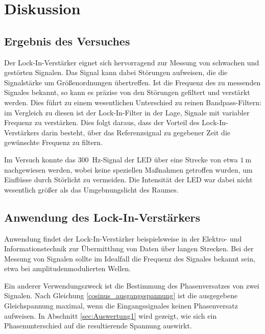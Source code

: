 \section{Diskussion}
\label{sec:Diskussion}

\subsection{Ergebnis des Versuches}
Der Lock-In-Verstärker eignet sich hervorragend zur Messung von schwachen und gestörten Signalen.
Das Signal kann dabei Störungen aufweisen, die die Signalstärke um Größenordnungen übertreffen.
Ist die Frequenz des zu messenden Signales bekannt, so kann es präzise von den Störungen gefiltert und verstärkt werden.
Dies führt zu einem wesentlichen Unterschied zu reinen Bandpass-Filtern:
im Vergleich zu diesen ist der Lock-In-Filter in der Lage, Signale mit variabler Frequenz zu verstärken. 
Dies folgt daraus, dass der Vorteil des Lock-In-Verstärkers darin besteht, über das Referenzsignal zu gegebener Zeit die gewünschte Frequenz zu filtern.

Im Versuch konnte das \SI{300}{\hertz}-Signal der LED über eine Strecke von etwa $\SI{1}{\meter}$ nachgewiesen werden, wobei keine speziellen Maßnahmen getroffen wurden, um Einflüsse durch Störlicht zu vermeiden.
Die Intensität der LED war dabei nicht wesentlich größer als das Umgebnungslicht des Raumes.

\subsection{Anwendung des Lock-In-Verstärkers}
Anwendung findet der Lock-In-Verstärker beispielsweise in der Elektro- und Informationstechnik zur Übermittlung von Daten über langen Strecken.
Bei der Messung von Signalen sollte im Idealfall die Frequenz des Signales bekannt sein, etwa bei amplitudenmodulierten Wellen.

Ein anderer Verwendungszweck ist die Bestimmung des Phasenversatzes von zwei Signalen. 
Nach Gleichung \eqref{cosinus_ausgangsspannung} ist die ausgegebene Gleichspannung maximal, wenn die Eingangssignales keinen Phasenversatz aufweisen. 
In Abschnitt \ref{sec:Auswertung1} wird gezeigt, wie sich ein Phasenunterschied auf die resultierende Spannung auswirkt. 